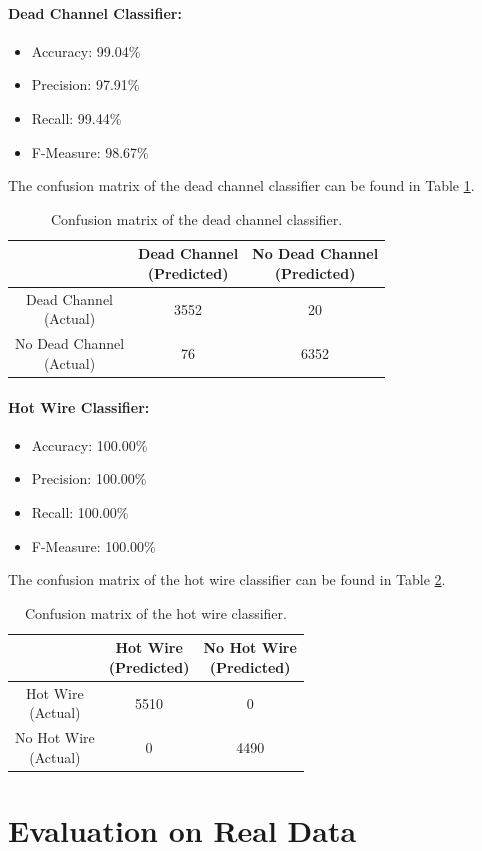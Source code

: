 \paragraph{Dead Channel Classifier:}
\begin{itemize}
  \item Accuracy: 99.04\%
  \item Precision: 97.91\%
  \item Recall: 99.44\%
  \item F-Measure: 98.67\%
\end{itemize}
The confusion matrix of the dead channel classifier can be found in Table
\ref{tbl:confusion-channel}.
\begin{table}[h]
  \centering
  \renewcommand\theadfont{\bfseries}
  \begin{tabular}{|c|c|c|}
    \hline
    & \thead{Dead Channel\\(Predicted)} & \thead{No Dead Channel\\(Predicted)} \\
    \hline
    \thead{Dead Channel\\(Actual)} & 3552 & 20\\
    \hline
    \thead{No Dead Channel\\(Actual)} & 76 & 6352\\
    \hline
  \end{tabular}
  \caption{Confusion matrix of the dead channel classifier.}
  \label{tbl:confusion-channel}
\end{table}

\paragraph{Hot Wire Classifier:}
\begin{itemize}
  \item Accuracy: 100.00\%
  \item Precision: 100.00\%
  \item Recall: 100.00\%
  \item F-Measure: 100.00\%
\end{itemize}
The confusion matrix of the hot wire classifier can be found in Table
\ref{tbl:confusion-hotwire}.
\begin{table}[h]
  \centering
  \renewcommand\theadfont{\bfseries}
  \begin{tabular}{|c|c|c|}
    \hline
    & \thead{Hot Wire\\(Predicted)} & \thead{No Hot Wire\\(Predicted)} \\
    \hline
    \thead{Hot Wire\\(Actual)} & 5510 & 0\\
    \hline
    \thead{No Hot Wire\\(Actual)} & 0 & 4490\\
    \hline
  \end{tabular}
  \caption{Confusion matrix of the hot wire classifier.}
  \label{tbl:confusion-hotwire}
\end{table}

\section{Evaluation on Real Data}
